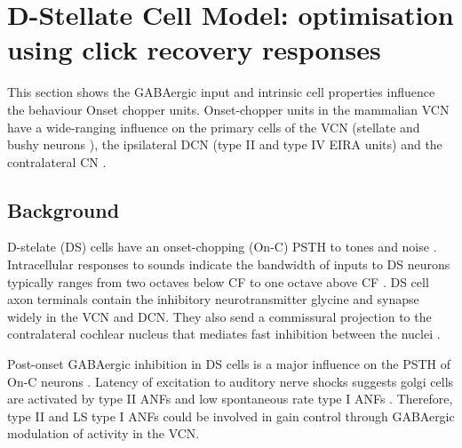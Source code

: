
\graphicspath{{/media/data/Work/cnstellate/DS_ClickRecovery/}{/media/data/Work/Responses/}}
\section[DS Cell Model]{D-Stellate Cell Model: optimisation using click recovery responses}
\label{sec:d-stellate-cell-model}


This section shows the GABAergic input and intrinsic
cell properties  influence the behaviour Onset chopper units.
Onset-chopper units in the mammalian VCN have a wide-ranging influence
on the primary cells of the VCN (stellate and bushy neurons \citep{RhodeSmithEtAl:1983}), the
ipsilateral DCN (type II and type IV EIRA units) and the contralateral CN \citep{NeedhamPaolini:2007}.  

\medskip{}








\subsection{Background}

  
D-stelate (DS) cells have an onset-chopping (On-C) PSTH to tones and noise
\citep{SmithRhode:1989,NeedhamPaolini:2006}. Intracellular responses to sounds
indicate the bandwidth of inputs to DS neurons typically ranges from two
octaves below CF to one octave above CF
\citep{PalmerJiangEtAl:1996,PaoliniClark:1999}. DS cell axon terminals contain
the inhibitory neurotransmitter glycine and synapse widely in the VCN and DCN.
They also send a commissural projection to the contralateral cochlear nucleus
that mediates fast inhibition between the nuclei
\citep{NeedhamPaolini:2003,NeedhamPaolini:2006}.  \citep{Oertel:1997}

Post-onset GABAergic inhibition in DS cells is a major influence on the PSTH
of On-C neurons \citep{FerragamoGoldingEtAl:1998a,EvansZhao:1998}. Latency of
excitation to auditory nerve shocks suggests golgi cells are activated by type
II ANFs and low spontaneous rate type I ANFs
\citep{BensonBerglundEtAl:1996,FerragamoGoldingEtAl:1998}. Therefore, type II
and LS type I ANFs could be involved in gain control through GABAergic
modulation of activity in the VCN.


